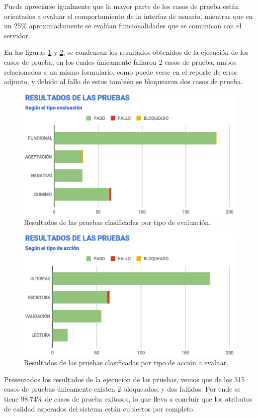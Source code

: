 Puede apreciarse igualmente que la mayor parte de los casos de prueba están
orientados a evaluar el comportamiento de la interfaz de usuario, mientras que
en un 25\% aproximadamente se evalúan funcionalidades que se comunican con el
servidor.

En las figuras \ref{results-tests} y \ref{results-type}, se condensan los
resultados obtenidos de la ejecución de los casos de prueba, en los cuales
únicamente fallaron 2 casos de prueba, ambos relacionados a un mismo formulario,
como puede verse en el reporte de error adjunto, y debido al fallo de estos
también se bloquearon dos casos de prueba.

\begin{figure}[H]
\centering
\includegraphics[width=1.0\textwidth]{graphics/results-tests.eps}
\caption{Resultados de las pruebas clasificadas por tipo de evaluación.}
\label{results-tests}
\end{figure}

\begin{figure}[H]
\centering
\includegraphics[width=1.0\textwidth]{graphics/results-type.eps}
\caption{Resultados de las pruebas clasificadas por tipo de acción a evaluar.}
\label{results-type}
\end{figure}

Presentados los resultados de la ejecución de las pruebas, vemos que de los 315
casos de pruebas únicamente existen 2 bloqueados, y dos fallidos. Por ende se
tiene 98.74\% de casos de prueba exitosos, lo que lleva a concluir que los
atributos de calidad esperados del sistema están cubiertos por completo.

